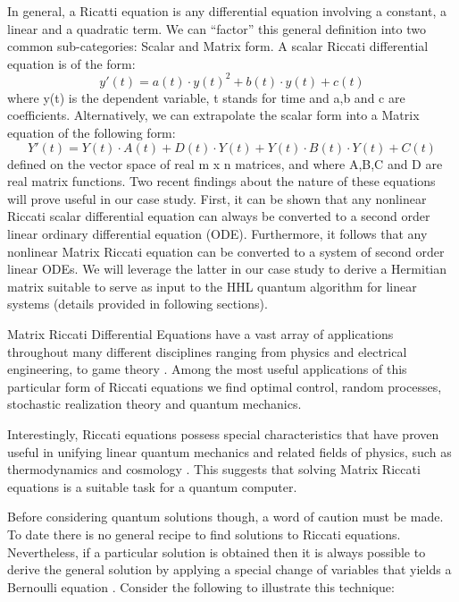 In general, a Ricatti equation is any differential equation involving a constant, a linear and a quadratic term. We can “factor” this general definition into two common sub-categories: Scalar and Matrix form. A scalar Riccati differential equation is of the form:
\begin{equation}
    y'(t) = a(t)\cdot y(t)^2 + b(t)\cdot y(t) + c(t)
\end{equation}
where y(t) is the dependent variable, t stands for time and a,b and c are coefficients. Alternatively, we can extrapolate the scalar form into a Matrix equation of the following form:
\begin{equation}
    Y'(t) = Y(t)\cdot A(t) + D(t) \cdot Y(t) + Y(t) \cdot B(t) \cdot Y(t) + C(t)
\end{equation}
defined on the vector space of real m x n matrices, and where A,B,C and D are real matrix functions. Two recent findings about the nature of these equations will prove useful in our case study. First, it can be shown that any nonlinear Riccati scalar differential equation can always be converted to a second order linear ordinary differential equation (ODE). Furthermore, it follows that any nonlinear Matrix Riccati equation can be converted to a system of second order linear ODEs. We will leverage the latter in our case study to derive a Hermitian matrix suitable to serve as input to the HHL quantum algorithm for linear systems (details provided in following sections).

Matrix Riccati Differential Equations have a vast array of applications throughout many different disciplines ranging from physics and electrical engineering, to game theory \cite{toivonen_chapter_2}. Among the most useful applications of this particular form of Riccati equations we find optimal control, random processes, stochastic realization theory and quantum mechanics. 

Interestingly, Riccati equations possess special characteristics that have proven useful in unifying linear quantum mechanics and related fields of physics, such as thermodynamics and cosmology \cite{schuch_nonlinear_2014}. This suggests that solving Matrix Riccati equations is a suitable task for a quantum computer.

Before considering quantum solutions though, a word of caution must be made. To date there is no general recipe to find solutions to Riccati equations. Nevertheless, if a particular solution is obtained then it is always possible to derive the general solution by applying a special change of variables that yields a Bernoulli equation \cite{dawkins_bernoulli_2018}. Consider the following to illustrate this technique:

